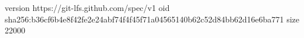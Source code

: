 version https://git-lfs.github.com/spec/v1
oid sha256:b36cf6b4e8f42fe2e24abf74f4f45f71a04565140b62c52d84bb62d16e6ba771
size 22000

